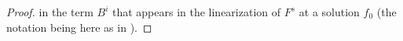 \documentclass[11pt]{amsart}
\begin{document}
\begin{proof}
in the term $B^i$ that appears in the linearization of $F^s$ at a solution $f_0$ (the notation being here as in \cite[Lemma 3]{SY81}).
%
\end{proof}
\end{document}
